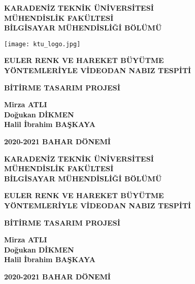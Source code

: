 \documentclass[a4paper, 12pt]{article}
\begin{document}
\thispagestyle{empty}
\begin{center}


\textbf{KARADENİZ TEKNİK ÜNİVERSİTESİ \\ MÜHENDİSLİK FAKÜLTESİ \\ BİLGİSAYAR MÜHENDİSLİĞİ BÖLÜMÜ}

\vspace{1cm}

\texttt{[image: ktu\_logo.jpg]}

\vspace*{2cm}

\textbf{EULER RENK VE HAREKET BÜYÜTME \\ YÖNTEMLERİYLE VİDEODAN NABIZ TESPİTİ}

\vspace*{\fill}

\textbf{BİTİRME TASARIM PROJESİ}

\vspace*{\fill}

\textbf{Mirza ATLI \\ Doğukan DİKMEN \\ Halil İbrahim BAŞKAYA}

\vspace*{\fill}

\textbf{2020-2021 BAHAR DÖNEMİ}



\newpage

\thispagestyle{empty}
\centering
\textbf{KARADENİZ TEKNİK ÜNİVERSİTESİ \\ MÜHENDİSLİK FAKÜLTESİ \\ BİLGİSAYAR MÜHENDİSLİĞİ BÖLÜMÜ}

\vspace*{\fill}


\textbf{EULER RENK VE HAREKET BÜYÜTME \\ YÖNTEMLERİYLE VİDEODAN NABIZ TESPİTİ}

\vspace*{\fill}


\textbf{BİTİRME TASARIM PROJESİ}

\vspace*{\fill}


\textbf{Mirza ATLI \\ Doğukan DİKMEN \\ Halil İbrahim BAŞKAYA}

\vspace*{\fill}
\textbf{2020-2021 BAHAR DÖNEMİ}


\newpage


\end{center}
\end{document}
